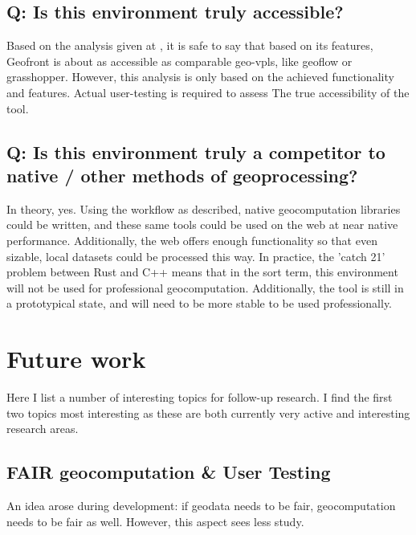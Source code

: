 \subsection*{Q: Is this environment truly accessible?}

Based on the analysis given at , it is safe to say that based on its features, Geofront is about as accessible as comparable geo-vpls, like geoflow or grasshopper. 
However, this analysis is only based on the achieved functionality and features. 
Actual user-testing is required to assess The true accessibility of the tool.

\subsection*{Q: Is this environment truly a competitor to native / other methods of geoprocessing?}

In theory, yes.
Using the workflow as described, native geocomputation libraries could be written, and these same tools could be used on the web at near native performance. 
Additionally, the web offers enough functionality so that even sizable, local datasets could be processed this way.
In practice, the 'catch 21' problem between Rust and C++ means that in the sort term, this environment will not be used for professional geocomputation.
Additionally, the tool is still in a prototypical state, and will need to be more stable to be used professionally. 



\section{Future work}
\label{sec:future-work}

Here I list a number of interesting topics for follow-up research. 
I find the first two topics most interesting as these are both currently very active and interesting research areas.

\subsection{FAIR geocomputation \& User Testing}

An idea arose during development: if geodata needs to be fair, geocomputation needs to be fair as well. 
However, this aspect sees less study.

